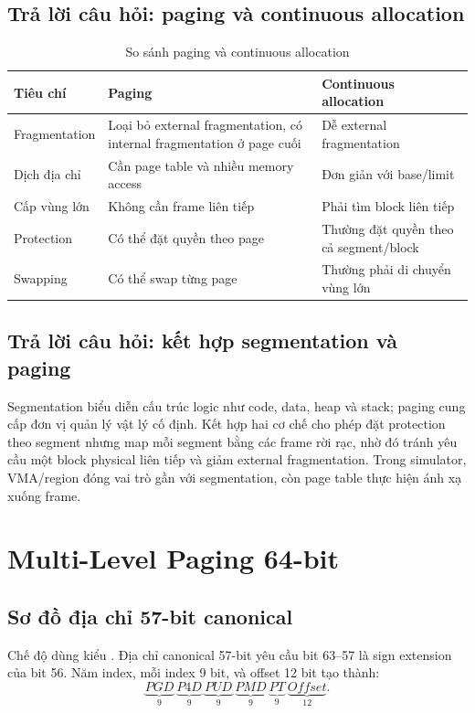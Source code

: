 \documentclass[12pt,a4paper]{article}
\newcommand{\code}[1]{\texttt{\detokenize{#1}}}
\begin{document}
\subsection{Trả lời câu hỏi: paging và continuous allocation}
\begin{table}[H]
\centering
\caption{So sánh paging và continuous allocation}
\begin{tabularx}{\textwidth}{|p{3.4cm}|X|X|}
\hline
Tiêu chí & Paging & Continuous allocation\\
\hline
Fragmentation & Loại bỏ external fragmentation, có internal fragmentation ở page cuối &
Dễ external fragmentation\\
\hline
Dịch địa chỉ & Cần page table và nhiều memory access & Đơn giản với base/limit\\
\hline
Cấp vùng lớn & Không cần frame liên tiếp & Phải tìm block liên tiếp\\
\hline
Protection & Có thể đặt quyền theo page & Thường đặt quyền theo cả segment/block\\
\hline
Swapping & Có thể swap từng page & Thường phải di chuyển vùng lớn\\
\hline
\end{tabularx}
\end{table}

\subsection{Trả lời câu hỏi: kết hợp segmentation và paging}
Segmentation biểu diễn cấu trúc logic như code, data, heap và stack; paging cung cấp đơn
vị quản lý vật lý cố định. Kết hợp hai cơ chế cho phép đặt protection theo segment nhưng
map mỗi segment bằng các frame rời rạc, nhờ đó tránh yêu cầu một block physical liên
tiếp và giảm external fragmentation. Trong simulator, VMA/region đóng vai trò gần với
segmentation, còn page table thực hiện ánh xạ xuống frame.

\section{Multi-Level Paging 64-bit}

\subsection{Sơ đồ địa chỉ 57-bit canonical}
Chế độ \code{MM64} dùng kiểu \code{addr_t = uint64_t}. Địa chỉ canonical 57-bit yêu
cầu bit 63--57 là sign extension của bit 56. Năm index, mỗi index 9 bit, và offset 12
bit tạo thành:
\[
\underbrace{PGD}_{9}~
\underbrace{P4D}_{9}~
\underbrace{PUD}_{9}~
\underbrace{PMD}_{9}~
\underbrace{PT}_{9}~
\underbrace{Offset}_{12}.
\]
\end{document}
